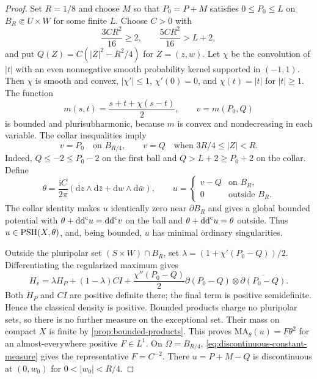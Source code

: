 \begin{proof}
Set $R=1/8$ and choose $M$ so that $P_0=P+M$ satisfies $0\leq P_0\leq L$ on $B_R\Subset U\times W$ for some finite $L$. Choose $C>0$ with
\begin{equation}\label{eq:compact-gluing-collar}
 \frac{3CR^2}{16}\geq2,\qquad
 \frac{5CR^2}{16}>L+2,
\end{equation}
and put $Q(Z)=C(|Z|^2-R^2/4)$ for $Z=(z,w)$. Let $\chi$ be the convolution of $|t|$ with an even nonnegative smooth probability kernel supported in $(-1,1)$. Then $\chi$ is smooth and convex, $|\chi'|\leq1$, $\chi'(0)=0$, and $\chi(t)=|t|$ for $|t|\geq1$. The function
\[
 m(s,t)=\frac{s+t+\chi(s-t)}2,\qquad v=m(P_0,Q)
\]
is bounded and plurisubharmonic, because $m$ is convex and nondecreasing in each variable. The collar inequalities imply
\[
 v=P_0\quad\text{on }B_{R/4},\qquad
 v=Q\quad\text{when }3R/4\leq|Z|<R.
\]
Indeed, $Q\leq-2\leq P_0-2$ on the first ball and $Q>L+2\geq P_0+2$ on the collar. Define
\[
 \theta=\frac{\mathrm{i}C}{2\pi}
  (\mathrm{d}z\wedge\mathrm{d}\bar z+\mathrm{d}w\wedge\mathrm{d}\bar w),
 \qquad
 u=\begin{cases}v-Q&\text{on }B_R,\\0&\text{outside }B_R.\end{cases}
\]
The collar identity makes $u$ identically zero near $\partial B_R$ and gives a global bounded potential with $\theta+\mathrm{dd}^{\mathrm{c}} u=\mathrm{dd}^{\mathrm{c}} v$ on the ball and $\theta+\mathrm{dd}^{\mathrm{c}} u=\theta$ outside. Thus $u\in\mathrm{PSH}(X,\theta)$, and, being bounded, $u$ has minimal ordinary singularities.

Outside the pluripolar set $(S\times W)\cap B_R$, set $\lambda=(1+\chi'(P_0-Q))/2$. Differentiating the regularized maximum gives
\begin{equation}\label{eq:regularized-max-hessian-density}
 H_v=\lambda H_P+(1-\lambda)CI
   +\frac{\chi''(P_0-Q)}2
        \partial(P_0-Q)\otimes\overline{\partial(P_0-Q)}.
\end{equation}
Both $H_P$ and $CI$ are positive definite there; the final term is positive semidefinite. Hence the classical density is positive. Bounded products charge no pluripolar sets, so there is no further measure on the exceptional set. Their mass on compact $X$ is finite by \cref{prop:bounded-products}. This proves $\mathrm{MA}_\theta(u)=F\theta^2$ for an almost-everywhere positive $F\in L^1$. On $\Omega=B_{R/4}$, \eqref{eq:discontinuous-constant-measure} gives the representative $F=C^{-2}$. There $u=P+M-Q$ is discontinuous at $(0,w_0)$ for $0<|w_0|<R/4$.


\end{proof}
